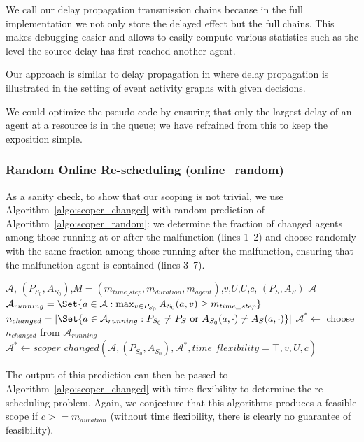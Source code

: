 \documentclass{article}
\begin{document}
We call our delay propagation transmission chains because in the full implementation we not only store the delayed effect but the full chains. This makes debugging easier and allows to easily compute various statistics such as the level the source delay has first reached another agent.

Our approach is similar to delay propagation in \cite{handbookofoptimizationinrailwayindustry} where delay propagation is illustrated in the setting of event activity graphs with given decisions.

We could optimize the pseudo-code by ensuring that only the largest delay of an agent at a resource is in the queue; we have refrained from this to keep the exposition simple.

\subsubsection{Random Online Re-scheduling (online\_random)}
\label{subsubsec:scope_online_random}

As a sanity check, to show that our scoping is not trivial, we use Algorithm~\ref{algo:scoper_changed} with random prediction of Algorithm~\ref{algo:scoper_random}: we determine the fraction of changed agents among those running at or after the malfunction (lines 1--2) and choose randomly with the same fraction among those running after the malfunction, ensuring that the malfunction agent is contained (lines 3--7).


\begin{algorithm}
	\caption{$scoper\_offline\_random$} \label{algo:scoper_random}
	\begin{algorithmic}[1]
		\Require $\mathcal{A}$, $(P_{S_0},A_{S_0})$,$M=(m_{time\_step},m_{duration},m_{agent})$,$v$,$U$,$U$,$c$, $(P_S,A_S)$
	    \Ensure $\mathcal{A}$
	    \State $\mathcal{A}_{running}=\Set{a \in \mathcal{A}: \max_{v \in P_{S_0}} A_{S_0}(a,v) \geq m_{time\_step}}$
	    \State $n_{changed} = \left| \Set{a\in \mathcal{A}_{running}:  P_{S_0} \not=P_{S} \textrm { or } A_{S_0}(a,\cdot) \not= A_{S}(a,\cdot)} \right|$
	    \State $\mathcal{A}^* \leftarrow$ choose $n_{changed}$ from $\mathcal{A}_{running}$
	    \State $\mathcal{A}^* \leftarrow scoper\_changed(\mathcal{A},(P_{S_0},A_{S_0}),\mathcal{A}^*,time\_flexibility=\top,v,U,c)$
	\end{algorithmic}
\end{algorithm}
The output of this prediction can then be passed to Algorithm~\ref{algo:scoper_changed} with time flexibility to determine the re-scheduling problem.
Again, we conjecture that this algorithms produces a feasible scope if $c >= m_{duration}$ (without time flexibility, there is clearly no guarantee of feasibility).
\end{document}
